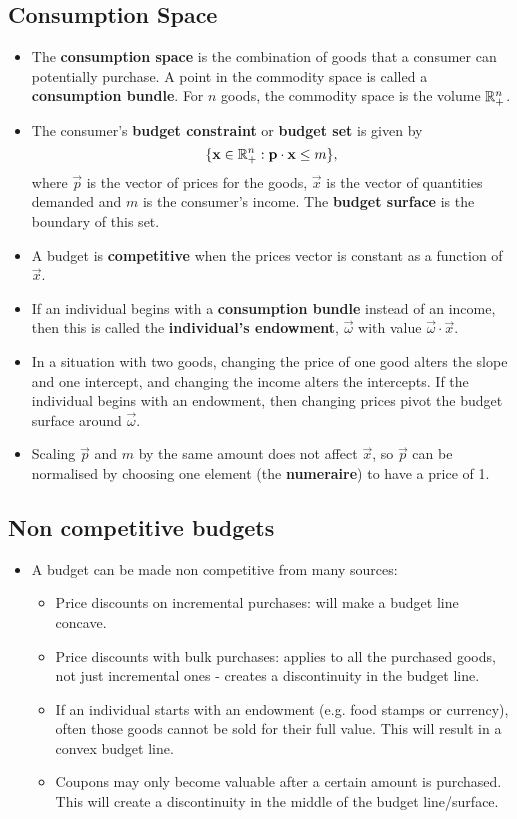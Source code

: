 \documentclass[a4paper]{article}
\begin{document}
\subsection{Consumption Space}
\begin{itemize}
    \item The \textbf{consumption space} is the combination of goods that a consumer can potentially purchase. A point in the commodity space is called a \textbf{consumption bundle}. For $n$ goods, the commodity space is the volume $\mathbb{R}_+^n$. 
    \item The consumer's \textbf{budget constraint} or \textbf{budget set} is given by $$\{\boldsymbol{\mathbf{x}} \in \mathbb{R}_+^n : \boldsymbol{\mathbf{p}} \cdot \boldsymbol{\mathbf{x}} \leq m\},$$ where $\vec{p}$ is the vector of prices for the goods, $\vec{x}$ is the vector of quantities demanded and $m$ is the consumer's income. The \textbf{budget surface} is the boundary of this set. 
    \item A budget is \textbf{competitive} when the prices vector is constant as a function of $\vec{x}$.
    \item If an individual begins with a \textbf{consumption bundle} instead of an income, then this is called the \textbf{individual's endowment}, $\vec{\omega}$ with value $\vec{\omega} \cdot \vec{x}$.
    \item In a situation with two goods, changing the price of one good alters the slope and one intercept, and changing the income alters the intercepts. If the individual begins with an endowment, then changing prices pivot the budget surface around $\vec{\omega}$.
    \item Scaling $\vec{p}$ and $m$ by the same amount does not affect $\vec{x}$, so $\vec{p}$ can be normalised by choosing one element (the \textbf{numeraire}) to have a price of 1.
\end{itemize}

\subsection{Non competitive budgets}
\begin{itemize}
    \item A budget can be made non competitive from many sources: 
    \begin{itemize}
        \item Price discounts on incremental purchases: will make a budget line concave. 
        \item Price discounts with bulk purchases: applies to all the purchased goods, not just incremental ones - creates a discontinuity in the budget line.
        \item If an individual starts with an endowment (e.g. food stamps or currency), often those goods cannot be sold for their full value. This will result in a convex budget line.
        \item Coupons may only become valuable after a certain amount is purchased. This will create a discontinuity in the middle of the budget line/surface. 
    \end{itemize}
\end{itemize}
\end{document}
